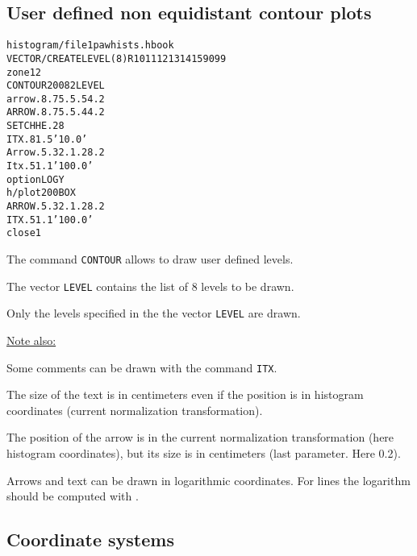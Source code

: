 \subsection*{User defined non equidistant contour plots}
\begin{alltt}
      histogram/file 1 pawhists.hbook
     VECTOR/CREATE LEVEL(8) R  10 11 12 13 14 15 90 99
      zone 1 2
     CONTOUR 200 8 2 LEVEL
      arrow .8 .75 .5 .54 .2
     ARROW .8 .75 .5 .44 .2
     SET CHHE .28
     ITX .81 .5 '10.0'
      Arrow .5 .32 .1 .28 .2
      Itx .51 .1 '100.0'
      option LOGY
      h/plot 200 BOX
     ARROW .5 .32 .1 .28 .2
     ITX .51 .1 '100.0'
      close 1
\end{alltt} 
The command {\tt CONTOUR} allows to draw user defined levels.
\begin{DinglistE}
\item The vector {\tt LEVEL} contains the list of 8 levels to
      be drawn.
\item Only the levels specified in the the vector {\tt LEVEL} are drawn.

\underline{Note also:}

\item Some comments can be drawn with the command {\tt ITX}.
\item The size of the text is in centimeters even if the position is
      in histogram coordinates (current normalization transformation).
\item The position of the arrow is in the current normalization transformation
      (here histogram coordinates), but its size is in centimeters (last
      parameter. Here 0.2).
\item Arrows and text can be drawn in logarithmic coordinates. For lines
      the logarithm should be computed with \SIGMA.
\end{DinglistE}

\clearpage

\subsection{Coordinate systems}

